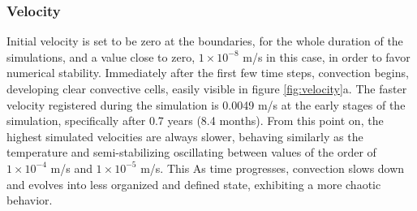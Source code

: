 \subsubsection{Velocity}
Initial velocity is set to be zero at the boundaries, for the whole duration of the simulations, and a value close to zero, $1\times10^{-8}$ m/s in this case, in order to favor numerical stability. Immediately after the first few time steps, convection begins, developing clear convective cells, easily visible in figure \ref{fig:velocity}a. The faster velocity registered during the simulation is 0.0049 m/s at the early stages of the simulation, specifically after 0.7 years (8.4 months). From this point on, the highest simulated velocities are always slower, behaving similarly as the temperature and semi-stabilizing oscillating between values of the order of  $1\times10^{-4}$ m/s and $1\times10^{-5}$ m/s. This 
As time progresses, convection slows down and evolves into less organized and defined state, exhibiting a more chaotic behavior.
